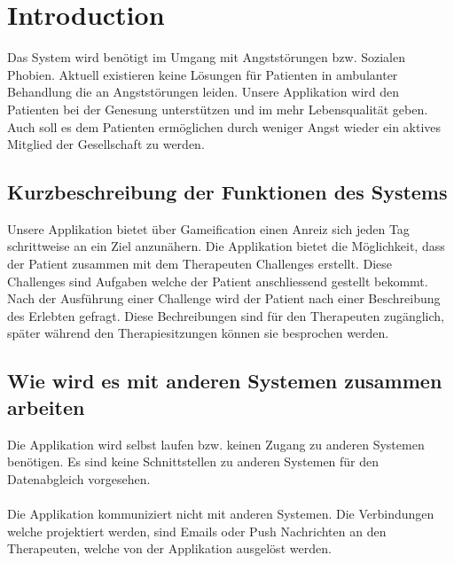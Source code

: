 \chapter{Introduction}

Das System wird benötigt im Umgang mit Angststörungen bzw. Sozialen Phobien. Aktuell existieren keine Lösungen für Patienten in ambulanter Behandlung die an Angststörungen leiden. Unsere Applikation wird den Patienten bei der Genesung unterstützen und im mehr Lebensqualität geben. Auch soll es dem Patienten ermöglichen durch weniger Angst wieder ein aktives Mitglied der Gesellschaft zu werden.

\section{Kurzbeschreibung der Funktionen des Systems}

Unsere Applikation bietet über Gameification einen Anreiz sich jeden Tag schrittweise an ein Ziel anzunähern. Die Applikation bietet die Möglichkeit, dass der Patient zusammen mit dem Therapeuten Challenges erstellt. Diese Challenges sind Aufgaben welche der Patient anschliessend gestellt bekommt. Nach der Ausführung einer Challenge wird der Patient nach einer Beschreibung des Erlebten gefragt. Diese Bechreibungen sind für den Therapeuten zugänglich, später während den Therapiesitzungen können sie besprochen werden.

\section{Wie wird es mit anderen Systemen zusammen arbeiten}

Die Applikation wird selbst laufen bzw. keinen Zugang zu anderen Systemen benötigen. Es sind keine Schnittstellen zu anderen Systemen für den Datenabgleich vorgesehen. \\ \\
Die Applikation kommuniziert nicht mit anderen Systemen. Die Verbindungen welche projektiert werden, sind Emails oder Push Nachrichten an den Therapeuten, welche von der Applikation ausgelöst werden.
